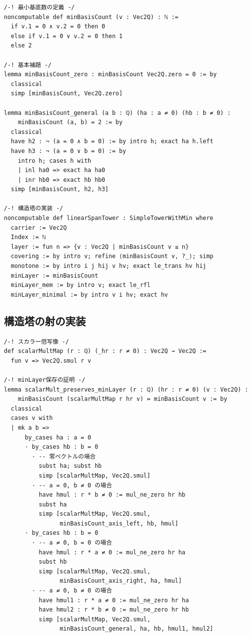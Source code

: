 \documentclass[a4paper,12pt]{ltjsarticle}
\theoremstyle{definition}
\begin{document}
\begin{verbatim}
/-! 最小基底数の定義 -/
noncomputable def minBasisCount (v : Vec2Q) : ℕ :=
  if v.1 = 0 ∧ v.2 = 0 then 0
  else if v.1 = 0 ∨ v.2 = 0 then 1
  else 2

/-! 基本補題 -/
lemma minBasisCount_zero : minBasisCount Vec2Q.zero = 0 := by
  classical
  simp [minBasisCount, Vec2Q.zero]

lemma minBasisCount_general (a b : ℚ) (ha : a ≠ 0) (hb : b ≠ 0) :
    minBasisCount (a, b) = 2 := by
  classical
  have h2 : ¬ (a = 0 ∧ b = 0) := by intro h; exact ha h.left
  have h3 : ¬ (a = 0 ∨ b = 0) := by
    intro h; cases h with
    | inl ha0 => exact ha ha0
    | inr hb0 => exact hb hb0
  simp [minBasisCount, h2, h3]

/-! 構造塔の実装 -/
noncomputable def linearSpanTower : SimpleTowerWithMin where
  carrier := Vec2Q
  Index := ℕ
  layer := fun n => {v : Vec2Q | minBasisCount v ≤ n}
  covering := by intro v; refine ⟨minBasisCount v, ?_⟩; simp
  monotone := by intro i j hij v hv; exact le_trans hv hij
  minLayer := minBasisCount
  minLayer_mem := by intro v; exact le_rfl
  minLayer_minimal := by intro v i hv; exact hv
\end{verbatim}

\subsection{構造塔の射の実装}

\begin{verbatim}
/-! スカラー倍写像 -/
def scalarMultMap (r : ℚ) (_hr : r ≠ 0) : Vec2Q → Vec2Q :=
  fun v => Vec2Q.smul r v

/-! minLayer保存の証明 -/
lemma scalarMult_preserves_minLayer (r : ℚ) (hr : r ≠ 0) (v : Vec2Q) :
    minBasisCount (scalarMultMap r hr v) = minBasisCount v := by
  classical
  cases v with
  | mk a b =>
      by_cases ha : a = 0
      · by_cases hb : b = 0
        · -- 零ベクトルの場合
          subst ha; subst hb
          simp [scalarMultMap, Vec2Q.smul]
        · -- a = 0, b ≠ 0 の場合
          have hmul : r * b ≠ 0 := mul_ne_zero hr hb
          subst ha
          simp [scalarMultMap, Vec2Q.smul,
                minBasisCount_axis_left, hb, hmul]
      · by_cases hb : b = 0
        · -- a ≠ 0, b = 0 の場合
          have hmul : r * a ≠ 0 := mul_ne_zero hr ha
          subst hb
          simp [scalarMultMap, Vec2Q.smul,
                minBasisCount_axis_right, ha, hmul]
        · -- a ≠ 0, b ≠ 0 の場合
          have hmul1 : r * a ≠ 0 := mul_ne_zero hr ha
          have hmul2 : r * b ≠ 0 := mul_ne_zero hr hb
          simp [scalarMultMap, Vec2Q.smul,
                minBasisCount_general, ha, hb, hmul1, hmul2]
\end{verbatim}
\end{document}
